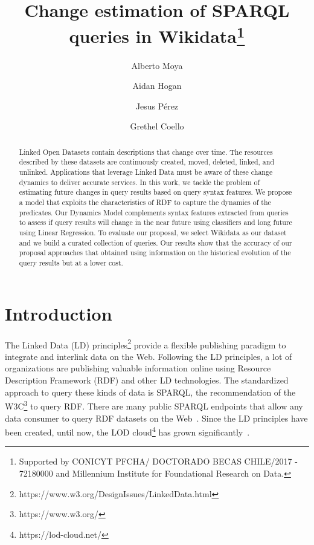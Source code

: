 \documentclass[runningheads]{llncs}
\begin{document}
%
\title{Change estimation of SPARQL queries in Wikidata\thanks{Supported by CONICYT PFCHA/ DOCTORADO BECAS CHILE/2017 - 72180000 and Millennium Institute for Foundational Research on Data.}}
%
%
\author{Alberto Moya \and
Aidan Hogan \and
Jesus P\'erez \and
Grethel Coello}
%
%
%
\maketitle              %
%
\begin{abstract}
Linked Open Datasets contain descriptions that change over time. The resources described by these datasets are continuously created, moved, deleted, linked, and unlinked. Applications that leverage Linked Data must be aware of these change dynamics to deliver accurate services. In this work, we tackle the problem of estimating future changes in query results based on query syntax features. We propose a model that exploits the characteristics of RDF to capture the dynamics of the predicates. Our Dynamics Model complements syntax features extracted from queries to assess if query results will change in the near future using classifiers and long future using Linear Regression. To evaluate our proposal, we select Wikidata as our dataset and we build a curated collection of queries. Our results show that the accuracy of our proposal approaches that obtained using information on the historical evolution of the query results but at a lower cost.

\end{abstract}
%
%
\section{Introduction}
\label{sec:intro}
%
The Linked Data (LD) principles\footnote{https://www.w3.org/DesignIssues/LinkedData.html} provide a flexible publishing paradigm to integrate and interlink data on the Web. Following the LD principles, a lot of organizations are publishing valuable information online using Resource Description Framework (RDF) and other LD technologies. The standardized approach to query these kinds of data is SPARQL, the recommendation of the W3C\footnote{https://www.w3.org/} to query RDF. There are many public SPARQL endpoints that allow any data consumer to query RDF datasets on the Web~\cite{VandenbusscheUM17}. Since the LD principles have been created, until now, the LOD cloud\footnote{https://lod-cloud.net/} has grown significantly~\cite{SchmachtenbergBP14}. 
\end{document}
